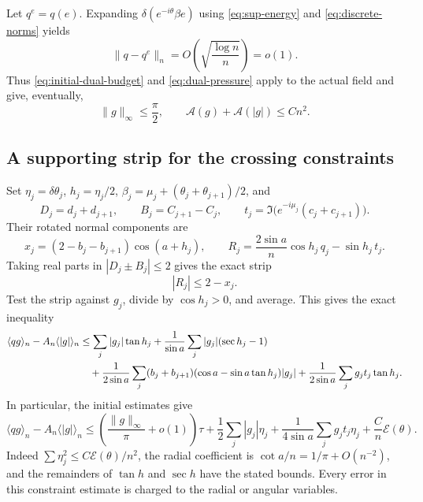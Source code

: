 \documentclass[11pt,reqno]{amsart}
\numberwithin{equation}{section}
\theoremstyle{definition}
\theoremstyle{remark}
\newcommand{\A}{\mathcal A}
\newcommand{\E}{\mathcal E}
\newcommand{\av}[1]{\langle #1\rangle_n}
\newcommand{\norm}[1]{\lVert #1\rVert}
\newcommand{\dd}{\delta}
\begin{document}
Let $q^e=q(e)$. Expanding $\dd(e^{-i\theta}\beta e)$ using \eqref{eq:sup-energy} and \eqref{eq:discrete-norms} yields
\begin{equation}\label{eq:deangle-error}
 \norm{q-q^e}_n=O\left(\sqrt{\frac{\log n}{n}}\right)=o(1).
\end{equation}
Thus \eqref{eq:initial-dual-budget} and \eqref{eq:dual-pressure} apply to the actual field and give, eventually,
\begin{equation}\label{eq:pressure-gap}
 \norm g_\infty\le\frac\pi2,
 \qquad \A(g)+\A(|g|)\le Cn^2.
\end{equation}

\subsection{A supporting strip for the crossing constraints}
Set $\eta_j=\dd\theta_j$, $h_j=\eta_j/2$, $\beta_j=\mu_j+(\theta_j+\theta_{j+1})/2$, and
\[
 D_j=d_j+d_{j+1},\qquad B_j=C_{j+1}-C_j,\qquad
 t_j=\Im\bigl(e^{-i\mu_j}(c_j+c_{j+1})\bigr).
\]
Their rotated normal components are
\begin{equation}\label{eq:rotating-crossing}
 x_j=(2-b_j-b_{j+1})\cos(a+h_j),\qquad
 R_j=\frac{2\sin a}{n}\cos h_j\,q_j-\sin h_j\,t_j.
\end{equation}
Taking real parts in $|D_j\pm B_j|\le2$ gives the exact strip
\begin{equation}\label{eq:strip}
 |R_j|\le2-x_j.
\end{equation}
Test the strip against $g_j$, divide by $\cos h_j>0$, and average. This gives the exact inequality
\begin{align}\label{eq:strip-signed}
 \av{qg}-A_n\av{|g|}
 &\le\sum_j|g_j|\tan h_j+\frac1{\sin a}\sum_j|g_j|(\sec h_j-1)\notag\\
 &\quad+\frac1{2\sin a}\sum_j(b_j+b_{j+1})(\cos a-\sin a\tan h_j)|g_j|
 +\frac1{2\sin a}\sum_jg_jt_j\tan h_j.
\end{align}
In particular, the initial estimates give
\begin{equation}\label{eq:signed-pressure}
 \av{qg}-A_n\av{|g|}
 \le\left(\frac{\norm g_\infty}{\pi}+o(1)\right)\tau
 +\frac12\sum_j|g_j|\eta_j
 +\frac1{4\sin a}\sum_jg_jt_j\eta_j+\frac Cn\E(\theta).
\end{equation}
Indeed $\sum\eta_j^2\le C\E(\theta)/n^2$, the radial coefficient is $\cot a/n=1/\pi+O(n^{-2})$, and the remainders of $\tan h$ and $\sec h$ have the stated bounds. Every error in this constraint estimate is charged to the radial or angular variables.
\end{document}
